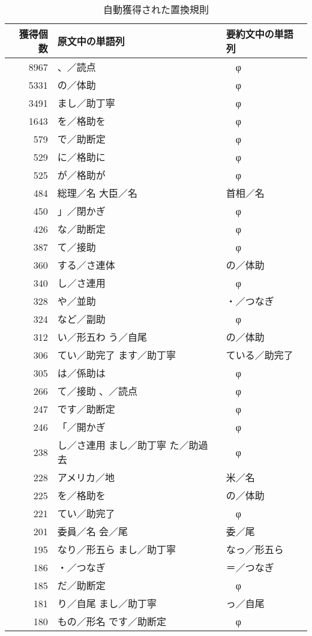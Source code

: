 \begin{table}
 \begin{center}
  \caption{自動獲得された置換規則}
  \begin{tabular}{|r|l|l|} \hline \hline
   獲得個数 & 原文中の単語列 & 要約文中の単語列 \\ \hline
   8967 & 、／読点 & 　φ\\
   5331 & の／体助 & 　φ\\
   3491 & まし／助丁寧 & 　φ\\
   1643 & を／格助を & 　φ\\
   579 & で／助断定 & 　φ\\
   529 & に／格助に & 　φ\\
   525 & が／格助が & 　φ\\
   484 & 総理／名 大臣／名 & 首相／名\\
   450 & 」／閉かぎ & 　φ\\
   426 & な／助断定 & 　φ\\ \hline
   387 & て／接助 & 　φ\\
   360 & する／さ連体 & の／体助\\
   340 & し／さ連用 & 　φ\\
   328 & や／並助 & ・／つなぎ\\
   324 & など／副助 & 　φ\\
   312 & い／形五わ う／自尾 & の／体助\\
   306 & てい／助完了 ます／助丁寧 & ている／助完了\\
   305 & は／係助は & 　φ\\
   266 & て／接助 、／読点 & 　φ\\
   247 & です／助断定 & 　φ\\ \hline
   246 & 「／開かぎ & 　φ\\
   238 & し／さ連用 まし／助丁寧 た／助過去 & 　φ\\
   228 & アメリカ／地 & 米／名\\
   225 & を／格助を & の／体助\\
   221 & てい／助完了 & 　φ\\
   201 & 委員／名 会／尾 & 委／尾\\
   195 & なり／形五ら まし／助丁寧 & なっ／形五ら\\
   186 & ・／つなぎ & ＝／つなぎ\\
   185 & だ／助断定 & 　φ\\
   181 & り／自尾 まし／助丁寧 & っ／自尾\\ \hline
   180 & もの／形名 です／助断定 & 　φ\\

\end{tabular}
\end{center}
\end{table}
